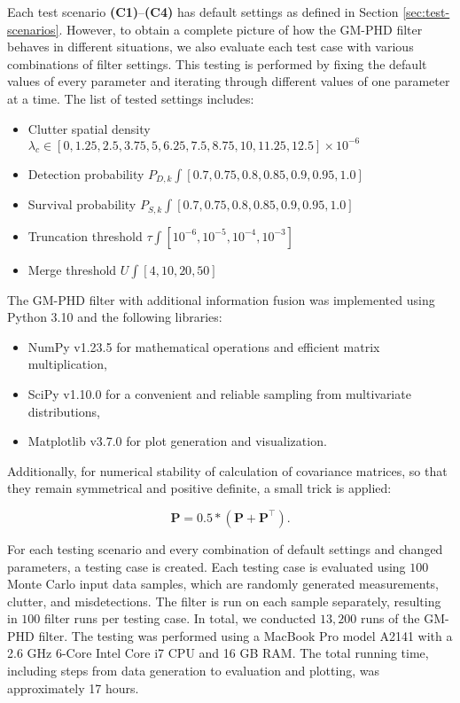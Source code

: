 Each test scenario \textbf{(C1)}--\textbf{(C4)} has default settings as defined in Section \ref{sec:test-scenarios}. However, to obtain a complete picture of how the GM-PHD filter behaves in different situations, we also evaluate each test case with various combinations of filter settings. This testing is performed by fixing the default values of every parameter and iterating through different values of one parameter at a time. The list of tested settings includes:

\begin{itemize}
    \item Clutter spatial density $\lambda_c \in [0, 1.25, 2.5, 3.75, 5, 6.25, 7.5, 8.75, 10, 11.25, 12.5] \times 10^{-6}$
    \item Detection probability $P_{D,k} \int [0.7, 0.75, 0.8, 0.85, 0.9, 0.95, 1.0]$
    \item Survival probability $P_{S,k} \int [0.7, 0.75, 0.8, 0.85, 0.9, 0.95, 1.0]$
    \item Truncation threshold $\tau \int [10^{-6}, 10^{-5}, 10^{-4}, 10^{-3}]$
    \item Merge threshold $U \int [4, 10, 20, 50]$
\end{itemize}

The GM-PHD filter with additional information fusion was implemented using Python 3.10 and the following libraries:

\begin{itemize}
    \item NumPy v1.23.5 for mathematical operations and efficient matrix multiplication,
    \item SciPy v1.10.0 for a convenient and reliable sampling from multivariate distributions,
    \item Matplotlib v3.7.0 for plot generation and visualization.
\end{itemize}

Additionally, for numerical stability of calculation of covariance matrices, so that they remain symmetrical and positive definite, a small trick is applied:

\begin{equation}
    \mathbf{P} = 0.5 * (\mathbf{P} + \mathbf{P}^\intercal).
\end{equation}

For each testing scenario and every combination of default settings and changed parameters, a testing case is created. Each testing case is evaluated using $100$ Monte Carlo input data samples, which are randomly generated measurements, clutter, and misdetections. The filter is run on each sample separately, resulting in $100$ filter runs per testing case. In total, we conducted $13,200$ runs of the GM-PHD filter. The testing was performed using a MacBook Pro model A2141 with a 2.6 GHz 6-Core Intel Core i7 CPU and 16 GB RAM. The total running time, including steps from data generation to evaluation and plotting, was approximately 17 hours.
